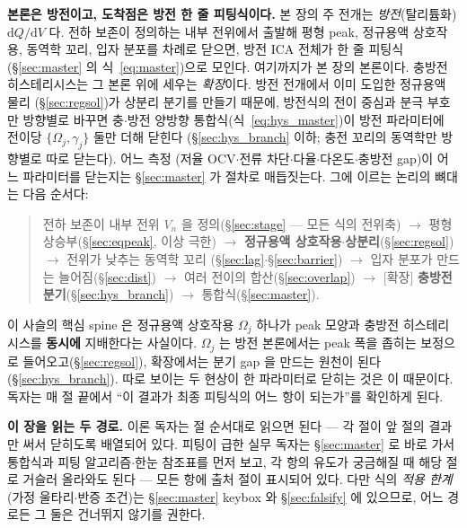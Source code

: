 \documentclass[11pt,a4paper]{article}
\newcommand{\dd}{\mathrm{d}}
\begin{document}
\textbf{본론은 방전이고, 도착점은 방전 한 줄 피팅식이다.} 본 장의 주 전개는 \emph{방전}(탈리튬화) $\dd Q/\dd V$
다. 전하 보존이 정의하는 내부 전위에서 출발해 평형 peak, 정규용액 상호작용, 동역학 꼬리, 입자 분포를 차례로
닫으면, 방전 ICA 전체가 한 줄 피팅식(\S\ref{sec:master} 의 식~\eqref{eq:master})으로 모인다. 여기까지가 본 장의
본론이다. 충방전 히스테리시스는 그 본론 위에 세우는 \emph{확장}이다. 방전 전개에서 이미 도입한 정규용액 물리
(\S\ref{sec:regsol})가 상분리 분기를 만들기 때문에, 방전식의 전이 중심과 분극 부호만 방향별로 바꾸면 충$\cdot$방전
양방향 통합식(식~\eqref{eq:hys_master})이 방전 파라미터에 전이당 $\{\Omega_j,\gamma_j\}$ 둘만 더해 닫힌다
(\S\ref{sec:hys_branch} 이하; 충전 꼬리의 동역학만 방향별로 따로 닫는다). 어느 측정
(저율 OCV$\cdot$전류 차단$\cdot$다율$\cdot$다온도$\cdot$충방전 gap)이 어느 파라미터를 닫는지는
\S\ref{sec:master} 가 절차로 매듭짓는다. 그에 이르는 논리의 뼈대는 다음 순서다:
\begin{quote}
전하 보존이 내부 전위 $V_n$ 을 정의(\S\ref{sec:stage} — 모든 식의 전위축) $\to$ 평형 상승부(\S\ref{sec:eqpeak},
이상 극한) $\to$ \textbf{정규용액 상호작용$\cdot$상분리}(\S\ref{sec:regsol}) $\to$ 전위가 낮추는 동역학 꼬리
(\S\ref{sec:lag}$\cdot$\S\ref{sec:barrier}) $\to$ 입자 분포가 만드는 늘어짐(\S\ref{sec:dist}) $\to$ 여러 전이의
합산(\S\ref{sec:overlap}) $\to$ [확장] \textbf{충방전 분기}(\S\ref{sec:hys_branch}) $\to$ 통합식(\S\ref{sec:master}).
\end{quote}
이 사슬의 핵심 spine 은 정규용액 상호작용 $\Omega_j$ 하나가 peak 모양과 충방전 히스테리시스를 \textbf{동시에}
지배한다는 사실이다. $\Omega_j$ 는 방전 본론에서는 peak 폭을 좁히는 보정으로 들어오고(\S\ref{sec:regsol}), 확장에서는
분기 gap 을 만드는 원천이 된다(\S\ref{sec:hys_branch}). 따로 보이는 두 현상이 한 파라미터로 닫히는 것은 이 때문이다.
독자는 매 절 끝에서 ``이 결과가 최종 피팅식의 어느 항이 되는가''를 확인하게 된다.

\textbf{이 장을 읽는 두 경로.} 이론 독자는 절 순서대로 읽으면 된다 — 각 절이 앞 절의 결과만 써서 닫히도록
배열되어 있다. 피팅이 급한 실무 독자는 \S\ref{sec:master} 로 바로 가서 통합식과 피팅 알고리즘$\cdot$한눈
참조표를 먼저 보고, 각 항의 유도가 궁금해질 때 해당 절로 거슬러 올라와도 된다 — 모든 항에 출처 절이 표시되어
있다. 다만 식의 \emph{적용 한계}(가정 울타리$\cdot$반증 조건)는 \S\ref{sec:master} keybox 와
\S\ref{sec:falsify} 에 있으므로, 어느 경로든 그 둘은 건너뛰지 않기를 권한다.
\end{document}
